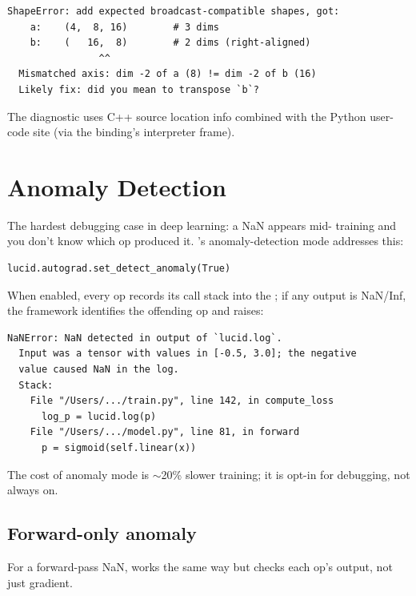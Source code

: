 \begin{lstlisting}[style=lucid,language=LucidPython]
ShapeError: add expected broadcast-compatible shapes, got:
    a:    (4,  8, 16)        # 3 dims
    b:    (   16,  8)        # 2 dims (right-aligned)
                ^^
  Mismatched axis: dim -2 of a (8) != dim -2 of b (16)
  Likely fix: did you mean to transpose `b`?
\end{lstlisting}

The diagnostic uses C++ source location info combined with the
Python user-code site (via the binding's interpreter frame).

\section{Anomaly Detection}
\label{sec:error_handling:anomaly}

The hardest debugging case in deep learning: a NaN appears mid-
training and you don't know which op produced it. \Lucid's
anomaly-detection mode addresses this:

\begin{lstlisting}[style=lucid,language=LucidPython]
lucid.autograd.set_detect_anomaly(True)
\end{lstlisting}

When enabled, every op records its call stack into the
; if any output is NaN/Inf, the framework
identifies the offending op and raises:

\begin{lstlisting}[style=lucid,language=LucidPython]
NaNError: NaN detected in output of `lucid.log`.
  Input was a tensor with values in [-0.5, 3.0]; the negative
  value caused NaN in the log.
  Stack:
    File "/Users/.../train.py", line 142, in compute_loss
      log_p = lucid.log(p)
    File "/Users/.../model.py", line 81, in forward
      p = sigmoid(self.linear(x))
\end{lstlisting}

The cost of anomaly mode is $\sim$20\% slower training; it is
opt-in for debugging, not always on.

\subsection{Forward-only anomaly}
\label{ssec:error_handling:fwd_anomaly}

For a forward-pass NaN,  works
the same way but checks each op's output, not just gradient.

